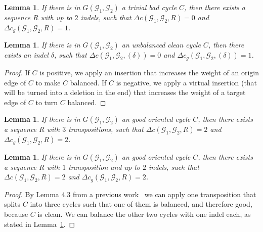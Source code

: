 \documentclass[12pt]{article}
\newtheorem{lemma}[theorem]{Lemma}
\begin{document}
\vspace{8pt}
\begin{lemma}\cite[Lemma 6]{2021b-alexandrino-etal}\label{lemma:triv_2d}
If there is in $G(\mathcal{G}_1,\mathcal{G}_2)$ a trivial bad cycle $C$, then there exists a sequence $R$ with up to $2$ indels, such that $\Delta c(\mathcal{G}_1,\mathcal{G}_2,R) = 0$ and $\Delta c_g(\mathcal{G}_1,\mathcal{G}_2,R) = 1$.
\end{lemma}

\vspace{8pt}
\begin{lemma}\label{lemma:unbal}
If there is in $G(\mathcal{G}_1,\mathcal{G}_2)$ an unbalanced clean cycle $C$, then there exists an indel $\delta$, such that $\Delta c(\mathcal{G}_1,\mathcal{G}_2,(\delta)) = 0$ and $\Delta c_g(\mathcal{G}_1,\mathcal{G}_2,(\delta)) = 1$.
\end{lemma}

\begin{proof}
If $C$ is positive, we apply an insertion that increases the weight of an origin edge of $C$ to make $C$ balanced. If $C$ is negative, we apply a virtual insertion (that will be turned into a deletion in the end) that increases the weight of a target edge of $C$ to turn $C$ balanced.
\end{proof}

\vspace{8pt}
\begin{lemma}\cite[Lemma 4.6]{2021a-oliveira-etal}\label{lemma:good_ori_3t}
If there is in $G(\mathcal{G}_1,\mathcal{G}_2)$ an good oriented cycle $C$, then there exists a sequence $R$ with $3$ transpositions, such that $\Delta c(\mathcal{G}_1,\mathcal{G}_2,R) = 2$ and $\Delta c_g(\mathcal{G}_1,\mathcal{G}_2,R) = 2$.
\end{lemma}

\vspace{8pt}
\begin{lemma}\label{lemma:good_ori_1t_2d}
If there is in $G(\mathcal{G}_1,\mathcal{G}_2)$ an good oriented cycle $C$, then there exists a sequence $R$ with $1$ transposition and up to $2$ indels, such that $\Delta c(\mathcal{G}_1,\mathcal{G}_2,R) = 2$ and $\Delta c_g(\mathcal{G}_1,\mathcal{G}_2,R) = 2$.
\end{lemma}

\begin{proof}
By Lemma 4.3 from a previous work~\cite{2021a-oliveira-etal} we can apply one transposition that splits $C$ into three cycles such that one of them is balanced, and therefore good, because $C$ is clean. We can balance the other two cycles with one indel each, as stated in Lemma~\ref{lemma:unbal}.
\end{proof}
\end{document}
